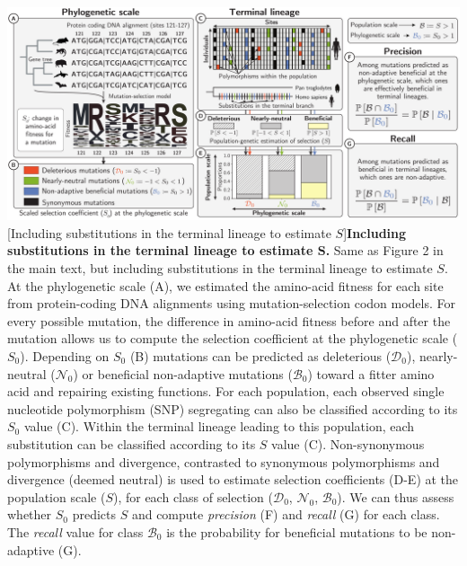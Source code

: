 \documentclass{article}
\newcommand{\Sphy}{S_{0}}
\newcommand{\SphyDel}{\mathcal{D}_0}
\newcommand{\SphyNeu}{\mathcal{N}_0}
\newcommand{\SphyBen}{\mathcal{B}_0}
\newcommand{\Spop}{S}
\begin{document}
    \begin{center}
            \includegraphics[width=\textwidth, page=1] {artworks/figure.method.proba.div.pdf}
            [Including substitutions in the terminal lineage to estimate $\Spop$]{\textbf{Including substitutions in the terminal lineage to estimate $\bm{\Spop}$.} Same as Figure 2 in the main text, but including substitutions in the terminal lineage to estimate $\Spop$.
            At the phylogenetic scale (A), we estimated the amino-acid fitness for each site from protein-coding DNA alignments using mutation-selection codon models.
            For every possible mutation, the difference in amino-acid fitness before and after the mutation allows us to compute the selection coefficient at the phylogenetic scale ($\Sphy$).
            Depending on $\Sphy$ (B) mutations can be predicted as deleterious ($\SphyDel$), nearly-neutral ($\SphyNeu$) or beneficial non-adaptive mutations ($\SphyBen$) toward a fitter amino acid and repairing existing functions.
            For each population, each observed single nucleotide polymorphism (SNP) segregating can also be classified according to its $\Sphy$ value (C).
            Within the terminal lineage leading to this population, each substitution can be classified according to its $\Spop$ value (C).
            Non-synonymous polymorphisms and divergence, contrasted to synonymous polymorphisms and divergence (deemed neutral) is used to estimate selection coefficients (D-E) at the population scale ($\Spop$), for each class of selection ($\SphyDel$, $\SphyNeu$, $\SphyBen$).
            We can thus assess whether $\Sphy$ predicts $\Spop$ and compute \textit{precision} (F) and \textit{recall} (G) for each class.
            The \textit{recall} value for class $\SphyBen$ is the probability for beneficial mutations to be non-adaptive (G).
            \label{fig-incdiv}
            }
    \end{center}
\end{document}
